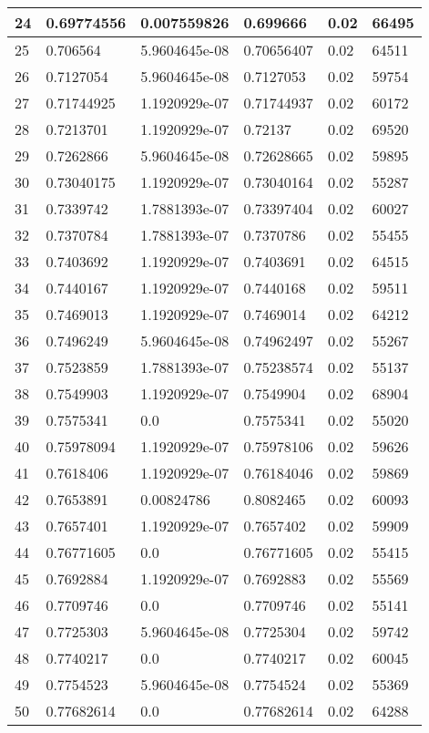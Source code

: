 \begin{longtable}{|l|l|l|l|l|l|}
24 & 0.69774556 & 0.007559826 & 0.699666 & 0.02 & 66495 \\ \hline 
25 & 0.706564 & 5.9604645e-08 & 0.70656407 & 0.02 & 64511 \\ \hline 
26 & 0.7127054 & 5.9604645e-08 & 0.7127053 & 0.02 & 59754 \\ \hline 
27 & 0.71744925 & 1.1920929e-07 & 0.71744937 & 0.02 & 60172 \\ \hline 
28 & 0.7213701 & 1.1920929e-07 & 0.72137 & 0.02 & 69520 \\ \hline 
29 & 0.7262866 & 5.9604645e-08 & 0.72628665 & 0.02 & 59895 \\ \hline 
30 & 0.73040175 & 1.1920929e-07 & 0.73040164 & 0.02 & 55287 \\ \hline 
31 & 0.7339742 & 1.7881393e-07 & 0.73397404 & 0.02 & 60027 \\ \hline 
32 & 0.7370784 & 1.7881393e-07 & 0.7370786 & 0.02 & 55455 \\ \hline 
33 & 0.7403692 & 1.1920929e-07 & 0.7403691 & 0.02 & 64515 \\ \hline 
34 & 0.7440167 & 1.1920929e-07 & 0.7440168 & 0.02 & 59511 \\ \hline 
35 & 0.7469013 & 1.1920929e-07 & 0.7469014 & 0.02 & 64212 \\ \hline 
36 & 0.7496249 & 5.9604645e-08 & 0.74962497 & 0.02 & 55267 \\ \hline 
37 & 0.7523859 & 1.7881393e-07 & 0.75238574 & 0.02 & 55137 \\ \hline 
38 & 0.7549903 & 1.1920929e-07 & 0.7549904 & 0.02 & 68904 \\ \hline 
39 & 0.7575341 & 0.0 & 0.7575341 & 0.02 & 55020 \\ \hline 
40 & 0.75978094 & 1.1920929e-07 & 0.75978106 & 0.02 & 59626 \\ \hline 
41 & 0.7618406 & 1.1920929e-07 & 0.76184046 & 0.02 & 59869 \\ \hline 
42 & 0.7653891 & 0.00824786 & 0.8082465 & 0.02 & 60093 \\ \hline 
43 & 0.7657401 & 1.1920929e-07 & 0.7657402 & 0.02 & 59909 \\ \hline 
44 & 0.76771605 & 0.0 & 0.76771605 & 0.02 & 55415 \\ \hline 
45 & 0.7692884 & 1.1920929e-07 & 0.7692883 & 0.02 & 55569 \\ \hline 
46 & 0.7709746 & 0.0 & 0.7709746 & 0.02 & 55141 \\ \hline 
47 & 0.7725303 & 5.9604645e-08 & 0.7725304 & 0.02 & 59742 \\ \hline 
48 & 0.7740217 & 0.0 & 0.7740217 & 0.02 & 60045 \\ \hline 
49 & 0.7754523 & 5.9604645e-08 & 0.7754524 & 0.02 & 55369 \\ \hline 
50 & 0.77682614 & 0.0 & 0.77682614 & 0.02 & 64288 \\ \hline 
\end{longtable}